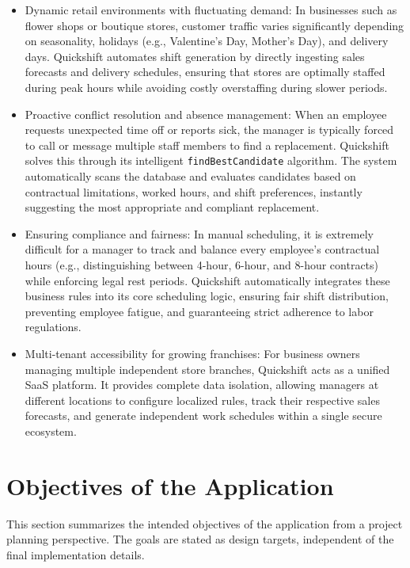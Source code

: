 \begin{itemize}
    \item Dynamic retail environments with fluctuating demand: In businesses such as flower shops or boutique stores, customer traffic varies significantly depending on seasonality, holidays (e.g., Valentine's Day, Mother's Day), and delivery days. Quickshift automates shift generation by directly ingesting sales forecasts and delivery schedules, ensuring that stores are optimally staffed during peak hours while avoiding costly overstaffing during slower periods.
    
    \item Proactive conflict resolution and absence management: When an employee requests unexpected time off or reports sick, the manager is typically forced to call or message multiple staff members to find a replacement. Quickshift solves this through its intelligent \texttt{findBestCandidate} algorithm. The system automatically scans the database and evaluates candidates based on contractual limitations, worked hours, and shift preferences, instantly suggesting the most appropriate and compliant replacement.
    
    \item Ensuring compliance and fairness: In manual scheduling, it is extremely difficult for a manager to track and balance every employee's contractual hours (e.g., distinguishing between 4-hour, 6-hour, and 8-hour contracts) while enforcing legal rest periods. Quickshift automatically integrates these business rules into its core scheduling logic, ensuring fair shift distribution, preventing employee fatigue, and guaranteeing strict adherence to labor regulations.
    
    \item Multi-tenant accessibility for growing franchises: For business owners managing multiple independent store branches, Quickshift acts as a unified SaaS platform. It provides complete data isolation, allowing managers at different locations to configure localized rules, track their respective sales forecasts, and generate independent work schedules within a single secure ecosystem.
\end{itemize}



\section{Objectives of the Application}

This section summarizes the intended objectives of the application from a project planning perspective. The goals are stated as design targets, independent of the final implementation details.

